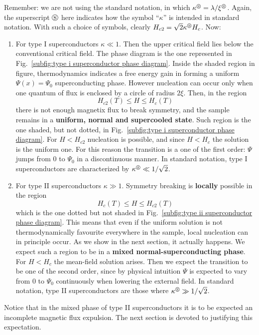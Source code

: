 Remember: we are not using the standard notation, in which $\kappa^\circledS = \lambda/\xi^\circledS$. Again, the superscript $\circledS$ here indicates how the symbol ``$\kappa$'' is intended in standard notation. With such a choice of symbols, clearly $H_{c2} = \sqrt{2} \kappa^\circledS H_c$. Now:
\begin{enumerate}
    \item For type I superconductors $\kappa \ll 1$. Then the upper critical field lies below the conventional critical field. The phase diagram is the one represented in Fig.~\ref{subfig:type i superconductor phase diagram}. Inside the shaded region in figure, thermodynamics indicates a free energy gain in forming a uniform $\Psi(x)=\Psi_0$ superconducting phase. However nucleation can occur only when one quantum of flux is enclosed by a circle of radius $2\xi$. Then, in the region
    \[
        H_{c2}(T) \le H \le H_c (T)
    \]
    there is not enough magnetix flux to break symmetry, and the sample remains in a \textbf{uniform, normal and supercooled state}. Such region is the one shaded, but not dotted, in Fig.~\ref{subfig:type i superconductor phase diagram}. For $H<H_{c2}$ nucleation is possible, and since $H<H_c$ the solution is the uniform one. For this reason the transition is a one of the first order: $\Psi$ jumps from $0$ to $\Psi_0$ in a discontinuous manner. In standard notation, type I superconductors are characterized by $\kappa^\circledS \ll 1/\sqrt{2}$.
    \item For type II superconductors $\kappa\gg1$. Symmetry breaking is \textbf{locally} possible in the region
    \[
        H_c(T) \le H \le H_{c2} (T)
    \]
    which is the one dotted but not shaded in Fig.~\ref{subfig:type ii superconductor phase diagram}. This means that even if the uniform solution is not thermodynamically favourite everywhere in the sample, local nucleation can in principle occur. As we show in the next section, it actually happens. We expect such a region to be in a \textbf{mixed normal-superconducting phase}. For $H < H_c$ the mean-field solution arises. Then we expect the transition to be one of the second order, since by physical intuition $\Psi$ is expected to vary from $0$ to $\Psi_0$ continuously when lowering the external field. In standard notation, type II superconductors are those where $\kappa^\circledS \gg 1/\sqrt{2}$.
\end{enumerate}
Notice that in the mixed phase of type II superconductors it is to be expected an incomplete magnetic flux expulsion. The next section is devoted to justifying this expectation.

